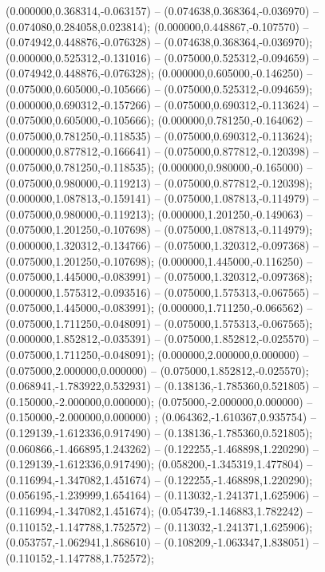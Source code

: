  (0.000000,0.368314,-0.063157) -- (0.074638,0.368364,-0.036970) -- (0.074080,0.284058,0.023814);
 (0.000000,0.448867,-0.107570) -- (0.074942,0.448876,-0.076328) -- (0.074638,0.368364,-0.036970);
 (0.000000,0.525312,-0.131016) -- (0.075000,0.525312,-0.094659) -- (0.074942,0.448876,-0.076328);
 (0.000000,0.605000,-0.146250) -- (0.075000,0.605000,-0.105666) -- (0.075000,0.525312,-0.094659);
 (0.000000,0.690312,-0.157266) -- (0.075000,0.690312,-0.113624) -- (0.075000,0.605000,-0.105666);
 (0.000000,0.781250,-0.164062) -- (0.075000,0.781250,-0.118535) -- (0.075000,0.690312,-0.113624);
 (0.000000,0.877812,-0.166641) -- (0.075000,0.877812,-0.120398) -- (0.075000,0.781250,-0.118535);
 (0.000000,0.980000,-0.165000) -- (0.075000,0.980000,-0.119213) -- (0.075000,0.877812,-0.120398);
 (0.000000,1.087813,-0.159141) -- (0.075000,1.087813,-0.114979) -- (0.075000,0.980000,-0.119213);
 (0.000000,1.201250,-0.149063) -- (0.075000,1.201250,-0.107698) -- (0.075000,1.087813,-0.114979);
 (0.000000,1.320312,-0.134766) -- (0.075000,1.320312,-0.097368) -- (0.075000,1.201250,-0.107698);
 (0.000000,1.445000,-0.116250) -- (0.075000,1.445000,-0.083991) -- (0.075000,1.320312,-0.097368);
 (0.000000,1.575312,-0.093516) -- (0.075000,1.575313,-0.067565) -- (0.075000,1.445000,-0.083991);
 (0.000000,1.711250,-0.066562) -- (0.075000,1.711250,-0.048091) -- (0.075000,1.575313,-0.067565);
 (0.000000,1.852812,-0.035391) -- (0.075000,1.852812,-0.025570) -- (0.075000,1.711250,-0.048091);
 (0.000000,2.000000,0.000000) -- (0.075000,2.000000,0.000000) -- (0.075000,1.852812,-0.025570);
 (0.068941,-1.783922,0.532931) -- (0.138136,-1.785360,0.521805) -- (0.150000,-2.000000,0.000000);
 (0.075000,-2.000000,0.000000) -- (0.150000,-2.000000,0.000000) ;
 (0.064362,-1.610367,0.935754) -- (0.129139,-1.612336,0.917490) -- (0.138136,-1.785360,0.521805);
 (0.060866,-1.466895,1.243262) -- (0.122255,-1.468898,1.220290) -- (0.129139,-1.612336,0.917490);
 (0.058200,-1.345319,1.477804) -- (0.116994,-1.347082,1.451674) -- (0.122255,-1.468898,1.220290);
 (0.056195,-1.239999,1.654164) -- (0.113032,-1.241371,1.625906) -- (0.116994,-1.347082,1.451674);
 (0.054739,-1.146883,1.782242) -- (0.110152,-1.147788,1.752572) -- (0.113032,-1.241371,1.625906);
 (0.053757,-1.062941,1.868610) -- (0.108209,-1.063347,1.838051) -- (0.110152,-1.147788,1.752572);

